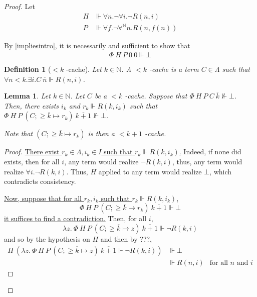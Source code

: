 \documentclass{article}
\newcommand{\N}{\mathbb{N}}
\newcommand{\depforall}[1]{\forall^\N #1.}
\newcommand{\realizes}{\Vdash}
\newtheorem{definition}{Definition}
\newtheorem{lemma}{Lemma}
\begin{document}
\begin{proof}

Let
\begin{align*}
    H & \realizes \forall n. \neg \forall i. \neg R(n, i) \\
    P & \realizes \forall f. \neg \depforall{n} R(n, f(n))
\end{align*}

By \cref{impliesintro}, it is necessarily and sufficient to show that
\[\Phi\ H\ P\ \overline{0}\ \overline{0} \realizes \bot \]

\begin{definition}[$<k$ -cache]
    Let $k \in \N$. A $<k$ -cache is a term $C \in \Lambda$ such that $\forall n < k. \exists i. C\ \overline{n} \realizes R(n, i)$.
\end{definition}

\begin{lemma}\label{growcache}
    Let $k \in \N$.
    Let $C$ be a $< k$ -cache.
    Suppose that $\Phi\ H\ P\ C\ \overline{k} \not\realizes \bot$.
    Then, there exists $i_k$ and $r_k \realizes R(k, i_k)$ such that $\Phi\ H\ P\ (C; \ge \overline{k} \mapsto r_k)\ \overline{k+1} \not\realizes \bot$.

    Note that $(C; \ge \overline{k} \mapsto r_k)$ is then a $< k + 1$ -cache.
\end{lemma}

\begin{proof}
    \ul{There exist $r_k \in \Lambda, i_k \in I$ such that $r_k \realizes R(k, i_k)$.} Indeed, if none did exists, then for all $i$, any term would realize $\neg R(k, i)$, thus, any term would realize $\forall i. \neg R(k, i)$. Thus, $H$ applied to any term would realize $\bot$, which contradicts consistency.

    \ul{Now, suppose that for all $r_k, i_k$ such that $r_k \realizes R(k, i_k)$},
    \[ \Phi\ H\ P\ (C; \ge \overline{k} \mapsto r_k)\ \overline{k+1} \realizes \bot \]
    \ul{it suffices to find a contradiction.} Then, for all $i$,
    \[ \lambda z.\ \Phi\ H\ P\ (C; \ge \overline{k} \mapsto z)\ \overline{k+1} \realizes \neg R(k, i) \]
    and so by the hypothesis on $H$ and then by ???,
    \begin{align*}
        H\ (\lambda z.\ \Phi\ H\ P\ (C; \ge \overline{k} \mapsto z)\ \overline{k+1} \realizes \neg R(k, i)) & \realizes \bot \\
        & \realizes R(n, i) & \text{for all $n$ and $i$}
    \end{align*}


\end{proof}
\end{proof}
\end{document}
